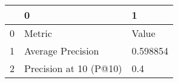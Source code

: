 \begin{tabular}{lll}
\toprule
{} &                       0 &         1 \\
\midrule
0 &                  Metric &     Value \\
1 &       Average Precision &  0.598854 \\
2 &  Precision at 10 (P@10) &       0.4 \\
\bottomrule
\end{tabular}
